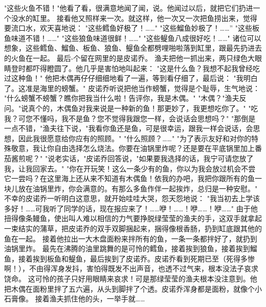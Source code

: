 \documentclass[12pt,UTF8]{ctexbook}
\begin{document}
"这些火鱼不错！"他看了看，很满意地闻了闻，说。他闻过以后，就把它们扔进一个没水的缸里。
接看他又照样来一次。就这样，他一次又一次把鱼捞出来，觉得要流口水，欢天喜地说：
"这些鳕鱼好极了！……"
"这些鰡鱼妙极了！……''
"这些板鱼味道不错！……"
"这些狼鱼味道很鲜！……"
"这些鳀鱼八成很好吃！……"
诸位可以想象，这些鳕鱼、鰡鱼、板鱼、狼鱼、鳀鱼全都劈哩啪啦落到缸里，跟最先扔进去的火鱼在一起。
最后-个留在网里的是皮诺乔。
渔夫把他一抓出来，两只绿色大眼睛登时都吓得瞪圆了。他几乎是害怕地叫起来：
"这是什么鱼？我想不起我曾经吃过这种鱼！"
他把木偶再仔仔细细地看了一遍，等到看仔细了，最后说：
"我明白了。这准是海里的螃蟹。"
皮诺乔听说把他当作螃蟹，觉得是个耻辱，生气地说：
"什么螃蟹不螃蟹？瞧你把我当什么啦！告评你，我是木偶。"
"木偶？"渔夫反问。"说真个的，木偶鱼对我来说是一种新的鱼！那更妙了，我更想吃你了。"
"吃我？可您不懂吗，我不是鱼？您不觉得我跟您一样，会说话会思想吗？"
"那倒是一点不错，"渔夫往下说，"我看你鱼还是鱼，可是很幸运，跟我一样会说话，会思想，因此我很愿意给你应有的照顾。"
"什么照顾？……"
"为了表示友好和对你的特殊敬意，我让你自由选择怎么烧法。你要在油锅里炸呢？还是要在平底锅里加上番茄酱煎呢？"
"说老实话，"皮诺乔回答说，"如果要我选择的话，我宁可请您放了我，让我回家去。"
"你在开玩笑！这么一条少有的鱼，你以为我会放过机会不尝它一尝吗？在这里海上还从来不知道有木偶鱼！依我的办吧，我把你跟所有的鱼一块儿放在油锅里炸，你会满意的。有那么多鱼作伴一起挨炸，总归是一种安慰。"
不幸的皮诺乔一听明白这意思，就开始哇哇大哭，怨天怨地说：
"我当初去上学该多好！……可我听了同学的话，现在报应来了！……咿！……！咿……！咿……"
由于他扭得像条鳗鱼，使出叫人难以相信的力气要挣脱绿莹莹的渔夫的手，这双手就拿起一束结实的蒲草，把皮诺乔的双手双脚捆起来，捆得像根香肠，扔到缸底跟其他的鱼在一起。
接着他拉出一大木盘面粉来拌所有的鱼，一条一条都拌好了，就扔到油锅里炸。
最先在沸腾的油里跳舞的是可怜的鳕鱼，接着挨到狼鱼，接着挨到鰡鱼，接着挨到板鱼和鳀鱼，最后挨到了皮诺乔。皮诺乔看到死期已至（死得多惨啊！），不由得浑身发抖，害怕得既发不出声音，也透不过气来，根本没法子哀求饶命。
这可怜的孩子只好用眼睛来哀求！可是那绿莹莹的渔夫根本没注意到。他把木偶在面粉里拌了五六遍，从头到脚拌了个透。皮诺乔浑身都是面粉，就像个小石膏像。
接着渔夫抓住他的头，一举手就……

\chapter{}
\end{document}

